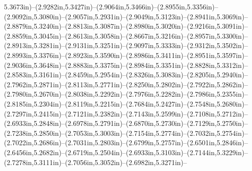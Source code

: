 5.3673in)--(2.9282in,5.3427in)--(2.9064in,5.3466in)--(2.8955in,5.3356in)--(2.9092in,5.3080in)--(2.9057in,5.2931in)--(2.9049in,5.3123in)--(2.8941in,5.3069in)--(2.8879in,5.3240in)--(2.8813in,5.3087in)--(2.8980in,5.3020in)--(2.9216in,5.3091in)--(2.8859in,5.3045in)--(2.8613in,5.3058in)--(2.8667in,5.3216in)--(2.8957in,5.3300in)--(2.8913in,5.3281in)--(2.9131in,5.3251in)--(2.9097in,5.3333in)--(2.9312in,5.3502in)--(2.8993in,5.3376in)--(2.8923in,5.3590in)--(2.8986in,5.3411in)--(2.8951in,5.3597in)--(2.9036in,5.3648in)--(2.8883in,5.3375in)--(2.8984in,5.3351in)--(2.8828in,5.3312in)--(2.8583in,5.3161in)--(2.8459in,5.2954in)--(2.8326in,5.3083in)--(2.8205in,5.2940in)--(2.7962in,5.2871in)--(2.8113in,5.2771in)--(2.8250in,5.2802in)--(2.7922in,5.2862in)--(2.7980in,5.2670in)--(2.8038in,5.2292in)--(2.7976in,5.2282in)--(2.7986in,5.2355in)--(2.8185in,5.2304in)--(2.8119in,5.2215in)--(2.7684in,5.2427in)--(2.7548in,5.2680in)--(2.7297in,5.2415in)--(2.7121in,5.2382in)--(2.7143in,5.2599in)--(2.7108in,5.2712in)--(2.6933in,5.2848in)--(2.6978in,5.2791in)--(2.6870in,5.2730in)--(2.7129in,5.2750in)--(2.7238in,5.2850in)--(2.7053in,5.3003in)--(2.7154in,5.2774in)--(2.7032in,5.2754in)--(2.7022in,5.2686in)--(2.7031in,5.2803in)--(2.6799in,5.2757in)--(2.6501in,5.2846in)--(2.6456in,5.2682in)--(2.6719in,5.2504in)--(2.6933in,5.3103in)--(2.7144in,5.3229in)--(2.7278in,5.3111in)--(2.7056in,5.3052in)--(2.6982in,5.3271in)--
